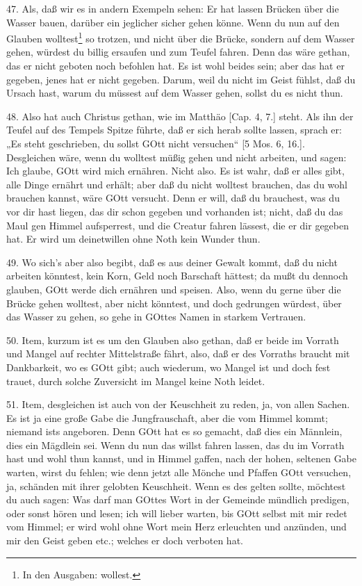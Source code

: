 47. Als, daß wir es in andern Exempeln sehen: Er hat lassen Brücken über die Wasser bauen, darüber ein jeglicher sicher gehen könne. Wenn du nun auf den Glauben wolltest\footnote{In den Ausgaben: wollest.} so trotzen, und nicht über die Brücke, sondern auf dem Wasser gehen, würdest du billig ersaufen und zum Teufel fahren. Denn das wäre gethan, das er nicht geboten noch befohlen hat. Es ist wohl beides sein; aber das hat er gegeben, jenes hat er nicht gegeben. Darum, weil du nicht im Geist fühlst, daß du Ursach hast, warum du müssest auf dem Wasser gehen, sollst du es nicht thun.

48. Also hat auch Christus gethan, wie im Matthäo [Cap. 4, 7.] steht. Als ihn der Teufel auf des Tempels Spitze führte, daß er sich herab sollte lassen, sprach er: „Es steht geschrieben, du sollst GOtt nicht versuchen“ [5 Mos. 6, 16.]. Desgleichen wäre, wenn du wolltest müßig gehen und nicht arbeiten, und sagen: Ich glaube, GOtt wird mich ernähren. Nicht also. Es ist wahr, daß er alles gibt, alle Dinge ernährt und erhält; aber daß du nicht wolltest brauchen, das du wohl brauchen kannst, wäre GOtt versucht. Denn er will, daß du brauchest, was du vor dir hast liegen, das dir schon gegeben und vorhanden ist; nicht, daß du das Maul gen Himmel aufsperrest, und die Creatur fahren lässest, die er dir gegeben hat. Er wird um deinetwillen ohne Noth kein Wunder thun.

49. Wo sich’s aber also begibt, daß es aus deiner Gewalt kommt, daß du nicht arbeiten könntest, kein Korn, Geld noch Barschaft hättest; da mußt du dennoch glauben, GOtt werde dich ernähren und speisen. Also, wenn du gerne über die Brücke gehen wolltest, aber nicht könntest, und doch gedrungen würdest, über das Wasser zu gehen, so gehe in GOttes Namen in starkem Vertrauen.

50. Item, kurzum ist es um den Glauben also gethan, daß er beide im Vorrath und Mangel auf rechter Mittelstraße fährt, also, daß er des Vorraths braucht mit Dankbarkeit, wo es GOtt gibt; auch wiederum, wo Mangel ist und doch fest trauet, durch solche Zuversicht im Mangel keine Noth leidet.

51. Item, desgleichen ist auch von der Keuschheit zu reden, ja, von allen Sachen. Es ist ja eine große Gabe die Jungfrauschaft, aber die vom Himmel kommt; niemand ists angeboren. Denn GOtt hat es so gemacht, daß dies ein Männlein, dies ein Mägdlein sei. Wenn du nun das willst fahren lassen, das du im Vorrath hast und wohl thun kannst, und in Himmel gaffen, nach der hohen, seltenen Gabe warten, wirst du fehlen; wie denn jetzt alle Mönche und Pfaffen GOtt versuchen, ja, schänden mit ihrer gelobten Keuschheit. Wenn es des gelten sollte, möchtest du auch sagen: Was darf man GOttes Wort in der Gemeinde mündlich predigen, oder sonst hören und lesen; ich will lieber warten, bis GOtt selbst mit mir redet vom Himmel; er wird wohl ohne Wort mein Herz erleuchten und anzünden, und mir den Geist geben etc.; welches er doch verboten hat.

